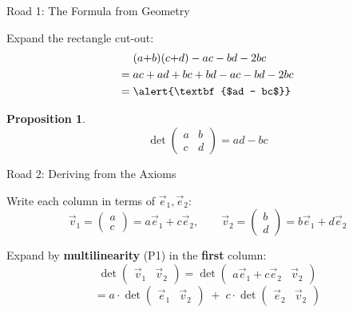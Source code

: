 \documentclass[10pt]{beamer}
\theoremstyle{definition}
\newtheorem{prop}{Proposition}[section]
\newcommand{\x}[1]{\alert{\textbf{#1}}}
\begin{document}
\begin{frame}{Road 1: The Formula from Geometry}

Expand the rectangle cut-out:
\begin{align*}
&(a{+}b)(c{+}d) - ac - bd - 2bc \\
={} & ac + ad + bc + bd - ac - bd - 2bc \\
={} & \x{$ad - bc$}
\end{align*}

\vfill

\begin{prop}
$$
\det \begin{pmatrix} a & b \\ c & d \end{pmatrix} = ad - bc
$$
\end{prop}

\end{frame}


\begin{frame}{Road 2: Deriving from the Axioms}

Write each column in terms of $\vec{e}_1, \vec{e}_2$:
$$
\vec{v}_1 = \begin{pmatrix} a \\ c \end{pmatrix} = a\vec{e}_1 + c\vec{e}_2, \qquad
\vec{v}_2 = \begin{pmatrix} b \\ d \end{pmatrix} = b\vec{e}_1 + d\vec{e}_2
$$

\vfill
Expand by \x{multilinearity} (P1) in the \x{first} column:
$$
\det\begin{pmatrix} \vec{v}_1 & \vec{v}_2 \end{pmatrix}
= \det\begin{pmatrix} a\vec{e}_1 + c\vec{e}_2 & \vec{v}_2 \end{pmatrix}
$$
$$
= a\cdot\det\begin{pmatrix} \vec{e}_1 & \vec{v}_2 \end{pmatrix}
\;+\; c\cdot\det\begin{pmatrix} \vec{e}_2 & \vec{v}_2 \end{pmatrix}
$$

\end{frame}
\end{document}
